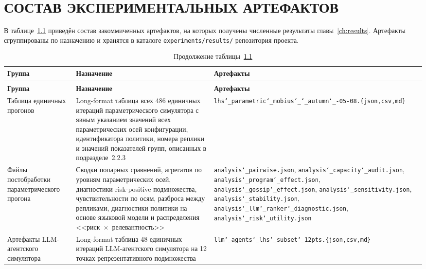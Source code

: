 \chapter{СОСТАВ ЭКСПЕРИМЕНТАЛЬНЫХ АРТЕФАКТОВ}
\label{app:artefacts}
\sloppy

В таблице~\ref{tab:artefacts} приведён состав закоммиченных артефактов, на которых получены численные результаты главы~\ref{ch:results}. Артефакты сгруппированы по назначению и хранятся в каталоге \texttt{experiments/results/} репозитория проекта.

\begingroup
\renewcommand{\_}{\char`_\allowbreak}
\begin{footnotesize}
\begin{longtable}{|>{\raggedright\arraybackslash}p{3.0cm}|>{\raggedright\arraybackslash}p{5.8cm}|>{\raggedright\arraybackslash}p{5.7cm}|}
\caption{Состав экспериментальных артефактов}\label{tab:artefacts}\\
\hline
\textbf{Группа} & \textbf{Назначение} & \textbf{Артефакты} \\
\hline
\endfirsthead
\caption*{Продолжение таблицы~\ref{tab:artefacts}}\\
\hline
\textbf{Группа} & \textbf{Назначение} & \textbf{Артефакты} \\
\hline
\endhead
\hline
\endfoot
\hline
\endlastfoot
Таблица единичных прогонов & Long-format таблица всех 486 единичных итераций параметрического симулятора с явным указанием значений всех параметрических осей конфигурации, идентификатора политики, номера реплики и значений показателей групп, описанных в подразделе~2.2.3 & \texttt{lhs\_parametric\_mobius\_2025\_autumn\_2026-05-08.\{json,csv,md\}} \\
\hline
Файлы постобработки параметрического прогона & Сводки попарных сравнений, агрегатов по уровням параметрических осей, диагностики risk-positive подмножества, чувствительности по осям, разброса между репликами, диагностики политики на основе языковой модели и распределения <<риск~$\times$~релевантность>> & \texttt{analysis\_pairwise.json}, \texttt{analysis\_capacity\_audit.json}, \texttt{analysis\_program\_effect.json}, \texttt{analysis\_gossip\_effect.json}, \texttt{analysis\_sensitivity.json}, \texttt{analysis\_stability.json}, \texttt{analysis\_llm\_ranker\_diagnostic.json}, \texttt{analysis\_risk\_utility.json} \\
\hline
Артефакты LLM-агентского симулятора & Long-format таблица 48 единичных итераций LLM-агентского симулятора на 12 точках репрезентативного подмножества & \texttt{llm\_agents\_lhs\_subset\_12pts.\{json,csv,md\}} \\

\end{longtable}
\end{footnotesize}
